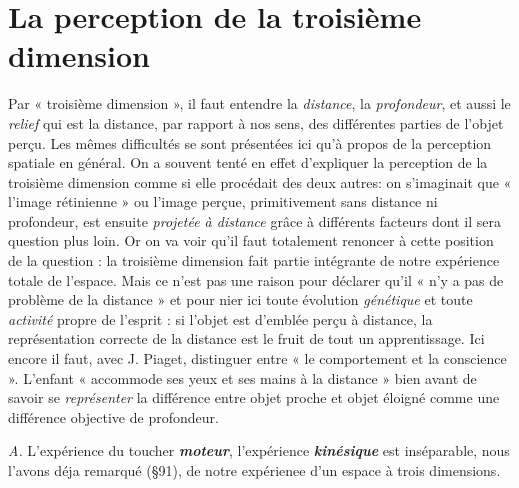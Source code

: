 \section{La perception de la troisième dimension}%
Par « troisième
dimension », il faut entendre la {\it distance}, la {\it profondeur}, et aussi
le {\it relief} qui est la distance, par rapport à nos sens, des différentes
parties de l’objet perçu. Les mêmes difficultés se sont présentées ici
qu’à propos de la perception spatiale en général. On a souvent tenté
en effet d’expliquer la perception de la troisième dimension comme
si elle procédait des deux autres: on s’imaginait que « l’image rétinienne »
ou l’image perçue, primitivement sans distance ni profondeur,
est ensuite {\it projetée à distance} grâce à différents facteurs dont
il sera question plus loin. Or on va voir qu’il faut totalement renoncer
à cette position de la question : la troisième dimension fait partie
intégrante de notre expérience totale de l’espace. Mais ce n’est pas
une raison pour déclarer qu’il « n’y a pas de problème de la distance »
et pour nier ici toute évolution {\it génétique} et toute {\it activité} propre de
l’esprit : si l’objet est d’emblée perçu à distance, la représentation
correcte de la distance est le fruit de tout un apprentissage. Ici encore
il faut, avec J. Piaget, distinguer entre « le comportement et la
conscience ». L'enfant « accommode ses yeux et ses mains à la distance »
bien avant de savoir se {\it représenter} la différence entre objet proche
et objet éloigné comme une différence objective de profondeur.

{\it A.} L'expérience du toucher \textbf{\textit {moteur}}, l'expérience \textbf{\textit {kinésique}} est
inséparable, nous l'avons déja remarqué (\S 91), de notre expérienee
d’un espace à trois dimensions.

